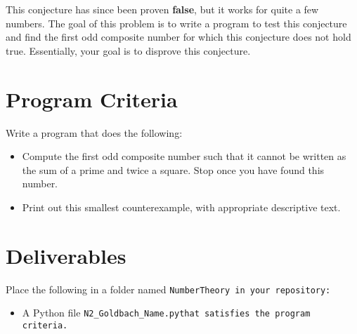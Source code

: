 \documentclass{article}
\def\prog#1{
\vspace{.1in}\begin{mdframed} \begin{center} \textbf{Programming Reminders} \end{center}#1 \end{mdframed} }
\newcommand\foldername{\tt{NumberTheory} }
\newcommand\filename{\tt{N2\_Goldbach\_Name.py}\;\;}
\begin{document}
	This conjecture has since been proven \textbf{false}, but it works for quite a few numbers.  The goal of this problem is to write a program to test this conjecture and find the first  odd composite number for which this conjecture does not hold true.  Essentially, your goal is to disprove this conjecture.

 
 	
 	
 	
 	
 	
 	
 	

	
	
	
	
	
	
	
	




\section*{Program Criteria}
	Write a program that does the following:
	\begin{itemize}
		\item Compute the first odd composite number such that it cannot be written as the sum of a prime and twice a square.  Stop once you have found this number.
		\item Print out this smallest counterexample, with appropriate descriptive text.		
	\end{itemize}







\section*{Deliverables}
	
	
	Place the following in a folder named \foldername in your repository:
	\begin{itemize}
		\item A Python file \filename  that satisfies the program criteria.
	\end{itemize}

	
\end{document}
